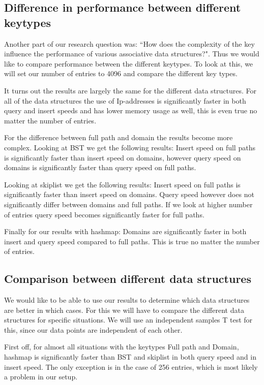 \documentclass[12pt,a4paper]{article}
\begin{document}
    \subsection{Difference in performance between different keytypes}
    Another part of our research question was: ``How does the complexity of the key influence the performance of 
    various associative data structures?". Thus we would like to compare performance between the different keytypes. 
    To look at this, we will set our number of entries to 4096 and compare the different key types.

    It turns out the results are largely the same for the different data structures. For all of the data structures the use of
    Ip-addresses is significantly faster in both query and insert speeds and has lower memory usage as well, this is even true
    no matter the number of entries. 

    For the difference between full path and domain the results become more complex. Looking at BST we get the following results:
    Insert speed on full paths is significantly faster than insert speed on domains, however query speed on domains is significantly faster
    than query speed on full paths. 

    Looking at skiplist we get the following results: Insert speed on full paths is significantly faster than insert speed on domains. Query
    speed however does not significantly differ between domains and full paths. If we look at higher number of entries query speed becomes 
    significantly faster for full paths. 

    Finally for our results with hashmap: Domains are significantly faster in both insert and query speed compared to full paths. 
    This is true no matter the number of entries.

    \subsection{Comparison between different data structures}
    We would like to be able to use our results to determine which data structures are better in which cases. 
    For this we will have to compare the different data structures for specific situations. We will use an independent
    samples T test for this, since our data points are independent of each other. 

    First off, for almost all situations with the keytypes Full path and Domain, hashmap is significantly faster than BST and skiplist
    in both query speed and in insert speed. The only exception is in the case of 256 entries, which is most likely a
    problem in our setup. 
\end{document}
